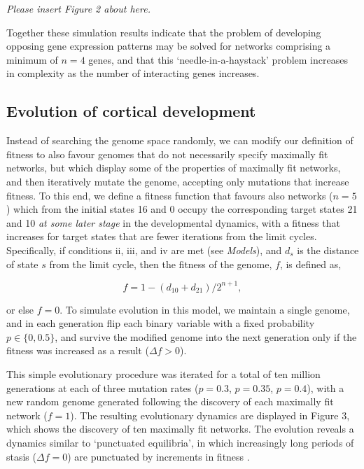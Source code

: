 \documentclass[10pt,letterpaper]{article}
\begin{document}
\vspace{1em}\emph{\noindent Please insert Figure 2 about here.}\vspace{1em}

Together these simulation results indicate that the problem of developing opposing gene expression patterns may be solved for networks comprising a minimum of $n=4$ genes, and that this `needle-in-a-haystack' problem increases in complexity as the number of interacting genes increases.

\subsection*{Evolution of cortical development}

Instead of searching the genome space randomly, we can modify our definition of fitness to also favour genomes that do not necessarily specify maximally fit networks, but which display some of the properties of maximally fit networks, and then iteratively mutate the genome, accepting only mutations that increase fitness. To this end, we define a fitness function that favours also networks ($n=5$) which from the initial states 16 and 0 occupy the corresponding target states 21 and 10 \emph{at some later stage} in the developmental dynamics, with a fitness that increases for target states that are fewer iterations from the limit cycles. Specifically, if conditions ii, iii, and iv are met (see \emph{Models}), and $d_s$ is the distance of state $s$ from the limit cycle, then the fitness of the genome, $f$, is defined as,

\begin{equation}
f=1-\left(d_{10}+d_{21}\right)/2^{n+1},
\end{equation}

\noindent or else $f=0$. To simulate evolution in this model, we maintain a single genome, and in each generation flip each binary variable with a fixed probability $p\in\{0,0.5\}$, and survive the modified genome into the next generation only if the fitness was increased as a result ($\Delta f>0$).

This simple evolutionary procedure was iterated for a total of ten million generations at each of three mutation rates ($p=0.3$, $p=0.35$, $p=0.4$), with a new random genome generated following the discovery of each maximally fit network ($f=1$). The resulting evolutionary dynamics are displayed in Figure 3, which shows the discovery of ten maximally fit networks. The evolution reveals a dynamics similar to `punctuated equilibria', in which increasingly long periods of stasis ($\Delta f=0$) are punctuated by increments in fitness \cite{Gould1977,Bak1996}.
\end{document}
